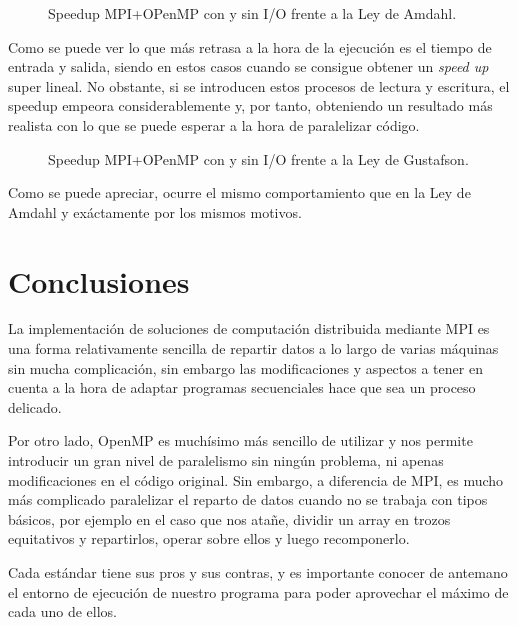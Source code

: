 \documentclass[12pt]{report} %
\begin{document}
\begin{figure}[H]
	\makebox[\textwidth][c]{
        
    }
	\caption{Speedup MPI+OPenMP con y sin I/O frente a la Ley de Amdahl.}
    \label{fig:comparacion_speedup}
\end{figure}

Como se puede ver lo que más retrasa a la hora de la ejecución es el tiempo de entrada y salida,
siendo en estos casos cuando se consigue obtener un \textit{speed up} super lineal. No obstante,
si se introducen estos procesos de lectura y escritura, el speedup empeora considerablemente y, por
tanto, obteniendo un resultado más realista con lo que se puede esperar a la hora de paralelizar código.

\begin{figure}[H]
	\makebox[\textwidth][c]{
        
    }
	\caption{Speedup MPI+OPenMP con y sin I/O frente a la Ley de Gustafson.}
    \label{fig:comparacion_speedup}
\end{figure}

Como se puede apreciar, ocurre el mismo comportamiento que en la Ley de Amdahl y exáctamente por
los mismos motivos.

\chapter{Conclusiones}

La implementación de soluciones de computación distribuida mediante MPI es una forma relativamente sencilla
de repartir datos a lo largo de varias máquinas sin mucha complicación, sin embargo las modificaciones y aspectos
a tener en cuenta a la hora de adaptar programas secuenciales hace que sea un proceso delicado.

Por otro lado, OpenMP es muchísimo más sencillo de utilizar y nos permite introducir un gran nivel de
paralelismo sin ningún problema, ni apenas modificaciones en el código original. Sin embargo, a diferencia
de MPI, es mucho más complicado paralelizar el reparto de datos cuando no se trabaja con tipos básicos,
por ejemplo en el caso que nos atañe, dividir un array en trozos equitativos y repartirlos, operar sobre
ellos y luego recomponerlo.

Cada estándar tiene sus pros y sus contras, y es importante conocer de antemano el entorno de ejecución de
nuestro programa para poder aprovechar el máximo de cada uno de ellos.


\nocite{*} %

\clearpage
{}
\printbibliography
\end{document}
